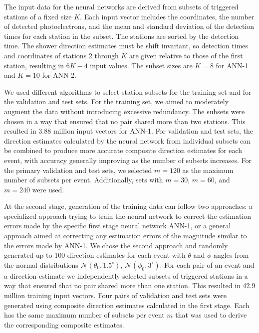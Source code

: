 \documentclass[reprint,
superscriptaddress,
amsmath,amssymb,aps,showkeys,showpacs,
twoside,final,secnumarabic,%
nofootinbib]{revtex4-2}
\begin{document}
The input data for the neural networks are derived from subsets of triggered stations of a fixed size $K$. Each input vector includes the coordinates, the number of detected photoelectrons, and the mean and standard deviation of the detection times for each station in the subset. The stations are sorted by the detection time. The shower direction estimates must be shift invariant, so detection times and coordinates of stations 2 through $K$ are given relative to those of the first station, resulting in $6K-4$ input values. The subset sizes are $K=8$ for ANN-1 and $K=10$ for ANN-2.

We used different algorithms to select station subsets for the training set and for the validation and test sets. For the training set, we aimed to moderately augment the data without introducing excessive redundancy. The subsets were chosen in a way that ensured that no pair shared more than two stations. This resulted in 3.88 million input vectors for ANN-1. For validation and test sets, the direction estimates calculated by the neural network from individual subsets can be combined to produce more accurate composite direction estimates for each event, with accuracy generally improving as the number of subsets increases. For the primary validation and test sets, we selected $m=120$ as the maximum number of subsets per event. Additionally, sets with $m=30$, $m=60$, and $m=240$ were used. 


At the second stage, generation of the training data can follow two approaches: a specialized approach trying to train the neural network to correct the estimation errors made by the specific first stage neural network ANN-1, or a general approach aimed at correcting any estimation errors of the magnitude similar to the errors made by ANN-1. We chose the second approach and randomly generated up to 100 direction estimates for each event with $\theta$ and $\phi$ angles from the normal distributions $\mathcal{N}(\theta_0, 1.5^\circ)$, $\mathcal{N}(\phi_0, 3^\circ)$.
For each pair of an event and a direction estimate we independently selected subsets of triggered stations in a way that ensured that no pair shared more than one station. This resulted in 42.9 million training input vectors. Four pairs of validation and test sets were generated using composite direction estimates calculated in the first stage. Each has the same maximum number of subsets per event $m$ that was used to derive the corresponding composite estimates. 
\end{document}
